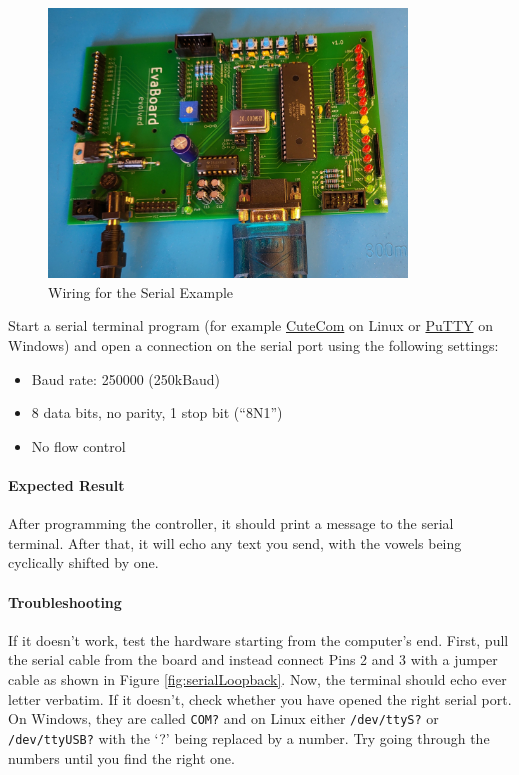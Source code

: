 \documentclass{article}
\newcommand{\file}[1]{\texttt{#1}}
\begin{document}
\begin{figure}[htb]
\centering
\includegraphics[width=0.85\textwidth]{Pictures/WiringSerial.jpg}
\caption{Wiring for the Serial Example}
\label{fig:wiringSerial}
\end{figure}

Start a serial terminal program (for example \href{https://cutecom.sourceforge.net/}{CuteCom} on Linux or \href{https://www.putty.org/}{PuTTY} on Windows) and open a connection on the serial port using the following settings:
\begin{itemize}
\item Baud rate: 250000 (250kBaud)
\item 8 data bits, no parity, 1 stop bit (``8N1'')
\item No flow control
\end{itemize}

\paragraph{Expected Result}
After programming the controller, it should print a message to the serial terminal. After that, it will echo any text you send, with the vowels being cyclically shifted by one. 

\paragraph{Troubleshooting}
If it doesn't work, test the hardware starting from the computer's end. First, pull the serial cable from the board and instead connect Pins 2 and 3 with a jumper cable as shown in Figure \ref{fig:serialLoopback}. Now, the terminal should echo ever letter verbatim. If it doesn't, check whether you have opened the right serial port. On Windows, they are called \texttt{COM?} and on Linux either \file{/dev/ttyS?} or \file{/dev/ttyUSB?} with the `?' being replaced by a number. Try going through the numbers until you find the right one. 
\end{document}
